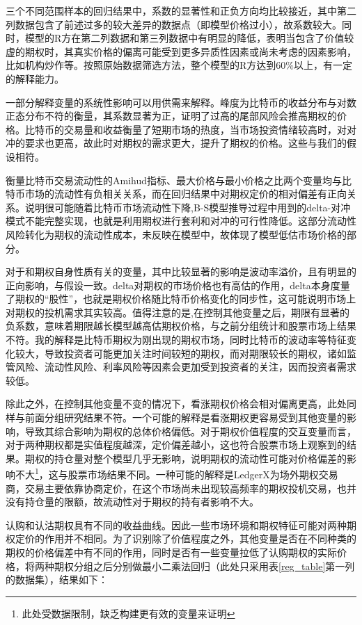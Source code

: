 \newpage
\restoregeometry
\par{三个不同范围样本的回归结果中，系数的显著性和正负方向均比较接近，其中第二列数据包含了前述过多的较大差异的数据点（即模型价格过小），故系数较大。同时，模型的R方在第二列数据和第三列数据中有明显的降低，表明当包含了价值较虚的期权时，其真实价格的偏离可能受到更多异质性因素或尚未考虑的因素影响，比如机构炒作等。按照原始数据筛选方法，整个模型的R方达到60$\%$以上，有一定的解释能力。}
\par{
一部分解释变量的系统性影响可以用供需来解释。峰度为比特币的收益分布与对数正态分布不符的衡量，其系数显著为正，证明了过高的尾部风险会推高期权的价格。比特币的交易量和收益衡量了短期市场的热度，当市场投资情绪较高时，对对冲的要求也更高，故此时对期权的需求更大，提升了期权的价格。这些与我们的假设相符。}
\par{衡量比特币交易流动性的Amihud指标、最大价格与最小价格之比两个变量均与比特币市场的流动性有负相关关系，而在回归结果中对期权定价的相对偏差有正向关系。说明很可能随着比特币市场流动性下降,B-S模型推导过程中用到的delta-对冲模式不能完整实现，也就是利用期权进行套利和对冲的可行性降低。这部分流动性风险转化为期权的流动性成本，未反映在模型中，故体现了模型低估市场价格的部分。
}
\par{对于和期权自身性质有关的变量，其中比较显著的影响是波动率溢价，且有明显的正向影响，与假设一致。delta对期权的市场价格也有高估的作用，delta本身度量了期权的“股性”，也就是期权价格随比特币价格变化的同步性，这可能说明市场上对期权的投机需求其实较高。值得注意的是,在控制其他变量之后，期限有显著的负系数，意味着期限越长模型越高估期权价格，与之前分组统计和股票市场上结果不符。我的解释是比特币期权为刚出现的期权市场，同时比特币的波动率等特征变化较大，导致投资者可能更加关注时间较短的期权，而对期限较长的期权，诸如监管风险、流动性风险、利率风险等因素会更加受到投资者的关注，因而投资者需求较低。}
\par{除此之外，在控制其他变量不变的情况下，看涨期权价格会相对偏离更高，此处同样与前面分组研究结果不符。一个可能的解释是看涨期权更容易受到其他变量的影响，导致其综合影响为期权的总体价格偏低。对于期权价值程度的交互变量而言，对于两种期权都是实值程度越深，定价偏差越小，这也符合股票市场上观察到的结果。期权的持仓量对整个模型几乎无影响，说明期权的流动性可能对价格偏差的影响不大\footnote{此处受数据限制，缺乏构建更有效的变量来证明}，这与股票市场结果不同。一种可能的解释是LedgerX为场外期权交易商，交易主要依靠协商定价，在这个市场尚未出现较高频率的期权投机交易，也并没有持仓量的限额，故流动性对于期权的持有者影响不大。}
\par{认购和认沽期权具有不同的收益曲线。因此一些市场环境和期权特征可能对两种期权定价的作用并不相同。为了识别除了价值程度之外，其他变量是否在不同种类的期权的价格偏差中有不同的作用，同时是否有一些变量拉低了认购期权的实际价格，将两种期权分组之后分别做最小二乘法回归（此处只采用表\ref{reg_table}第一列的数据集），结果如下：}
